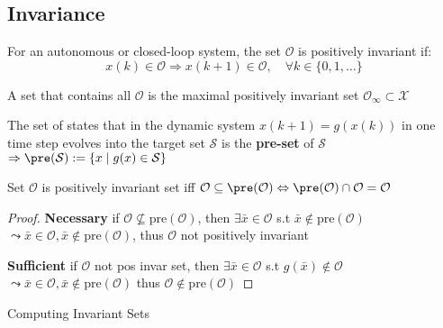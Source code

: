 
%
\subsection{Invariance}

\begin{definition}
	For an autonomous or closed-loop system,
	the set $\mathcal{O}$ is positively invariant if:
	\[
		x(k)\in\mathcal{O}\Rightarrow
		x(k+1) \in \mathcal{O},
		\quad \forall k \in \{0,1,\dots\}
	\]
\end{definition}

\begin{definition}
	A set that contains all $\mathcal{O}$
	is the maximal positively invariant set
	$\mathcal{O}_\infty \subset \mathcal{X}$
\end{definition}

\begin{definition}
	The set of states that
	in the dynamic system $x(k+1) = g(x(k))$
	in one time step evolves into the target set $\mathcal{S}$
	is the \textbf{pre-set} of $\mathcal{S}$
	$\Rightarrow \pre(\mathcal{S}) := \{x\mid g(x)\in \mathcal{S}\}$
\end{definition}

\begin{theorem}
	Set $\mathcal{O}$ is positively invariant set iff
	$\mathcal{O}\subseteq\pre(\mathcal{O})
		\Leftrightarrow
		\pre(\mathcal{O})\cap\mathcal{O} = \mathcal{O}$
\end{theorem}
\begin{proof}
	\textbf{Necessary} if
	$\mathcal{O} \nsubseteq  \mathrm{pre}(\mathcal{O})$,
	then $\exists\bar{x} \in \mathcal{O}$
	s.t $\bar{x} \notin \mathrm{pre}(\mathcal{O})$
	$\leadsto \bar{x}\in\mathcal{O},
		\bar{x}\notin\mathrm{pre}(\mathcal{O})$,
	thus $\mathcal{O}$ not positively invariant

	\textbf{Sufficient} if
	$\mathcal{O}$ not pos invar set,
	then $\exists \bar{x}\in\mathcal{O}$
	s.t $g(\bar{x}) \notin\mathcal{O}$
	$\leadsto \bar{x}\in\mathcal{O},
		\bar{x}\notin\mathrm{pre}(\mathcal{O})$
	thus $\mathcal{O}\notin \mathrm{pre}(\mathcal{O})$
\end{proof}


Computing Invariant Sets

